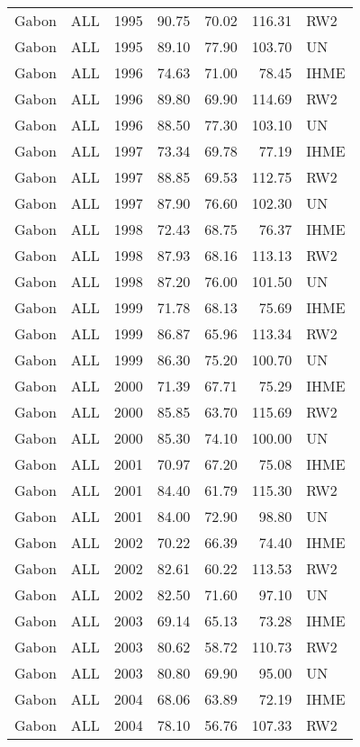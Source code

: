 \begin{longtable}{lllrrrl}
  Gabon & ALL & 1995 & 90.75 & 70.02 & 116.31 & RW2 \\ 
  Gabon & ALL & 1995 & 89.10 & 77.90 & 103.70 & UN \\ 
  Gabon & ALL & 1996 & 74.63 & 71.00 & 78.45 & IHME \\ 
  Gabon & ALL & 1996 & 89.80 & 69.90 & 114.69 & RW2 \\ 
  Gabon & ALL & 1996 & 88.50 & 77.30 & 103.10 & UN \\ 
  Gabon & ALL & 1997 & 73.34 & 69.78 & 77.19 & IHME \\ 
  Gabon & ALL & 1997 & 88.85 & 69.53 & 112.75 & RW2 \\ 
  Gabon & ALL & 1997 & 87.90 & 76.60 & 102.30 & UN \\ 
  Gabon & ALL & 1998 & 72.43 & 68.75 & 76.37 & IHME \\ 
  Gabon & ALL & 1998 & 87.93 & 68.16 & 113.13 & RW2 \\ 
  Gabon & ALL & 1998 & 87.20 & 76.00 & 101.50 & UN \\ 
  Gabon & ALL & 1999 & 71.78 & 68.13 & 75.69 & IHME \\ 
  Gabon & ALL & 1999 & 86.87 & 65.96 & 113.34 & RW2 \\ 
  Gabon & ALL & 1999 & 86.30 & 75.20 & 100.70 & UN \\ 
  Gabon & ALL & 2000 & 71.39 & 67.71 & 75.29 & IHME \\ 
  Gabon & ALL & 2000 & 85.85 & 63.70 & 115.69 & RW2 \\ 
  Gabon & ALL & 2000 & 85.30 & 74.10 & 100.00 & UN \\ 
  Gabon & ALL & 2001 & 70.97 & 67.20 & 75.08 & IHME \\ 
  Gabon & ALL & 2001 & 84.40 & 61.79 & 115.30 & RW2 \\ 
  Gabon & ALL & 2001 & 84.00 & 72.90 & 98.80 & UN \\ 
  Gabon & ALL & 2002 & 70.22 & 66.39 & 74.40 & IHME \\ 
  Gabon & ALL & 2002 & 82.61 & 60.22 & 113.53 & RW2 \\ 
  Gabon & ALL & 2002 & 82.50 & 71.60 & 97.10 & UN \\ 
  Gabon & ALL & 2003 & 69.14 & 65.13 & 73.28 & IHME \\ 
  Gabon & ALL & 2003 & 80.62 & 58.72 & 110.73 & RW2 \\ 
  Gabon & ALL & 2003 & 80.80 & 69.90 & 95.00 & UN \\ 
  Gabon & ALL & 2004 & 68.06 & 63.89 & 72.19 & IHME \\ 
  Gabon & ALL & 2004 & 78.10 & 56.76 & 107.33 & RW2 \\ 

\end{longtable}
